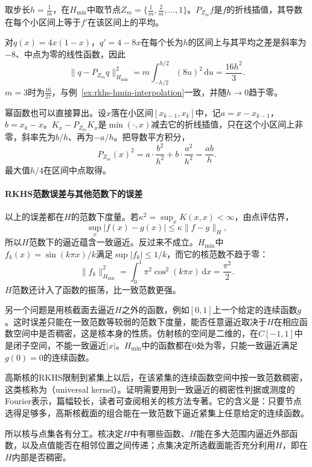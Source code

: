 \begin{example}[最小值核的均匀节点]
\label{ex:rkhs-hmin-grid}
取步长$h=\tfrac1m$，在$H_{\min}$中取节点$Z_m=\{\tfrac1m,\tfrac2m,\ldots,1\}$。$P_{Z_m}f$是$f$的折线插值，其导数在每个小区间上等于$f'$在该区间上的平均。

对$q(x)=4x(1-x)$，$q'=4-8x$在每个长为$h$的区间上与其平均之差是斜率为$-8$、中点为零的线性函数，因此
\[
\lVert q-P_{Z_m}q\rVert_{H_{\min}}^2=m\int_{-h/2}^{h/2}(8u)^2\,\mathrm du=\frac{16h^2}{3}.
\]
$m=3$时为$\tfrac{16}{27}$，与例~\ref{ex:rkhs-hmin-interpolation}一致，并随$h\to0$趋于零。

幂函数也可以直接算出。设$x$落在小区间$[x_{k-1},x_k]$中，记$a=x-x_{k-1}$，$b=x_k-x$。$K_x-P_{Z_m}K_x$是$\min(\cdot,x)$减去它的折线插值，只在这个小区间上非零，斜率先为$b/h$、再为$-a/h$。把导数平方积分，
\[
P_{Z_m}(x)^2=a\cdot\frac{b^2}{h^2}+b\cdot\frac{a^2}{h^2}=\frac{ab}{h}.
\]
最大值$h/4$在区间中点取得。
\end{example}

\paragraph{RKHS范数误差与其他范数下的误差}

以上的误差都在$H$的范数下度量。若$\kappa^2=\sup_xK(x,x)<\infty$，由点评估界，
\[
\sup_x\lvert f(x)-g(x)\rvert\leq\kappa\lVert f-g\rVert_H ,
\]
所以$H$范数下的逼近蕴含一致逼近。反过来不成立。$H_{\min}$中$f_k(x)=\sin(k\pi x)/k$满足$\sup\lvert f_k\rvert\leq1/k$，而它的核范数不趋于零：
\[
\lVert f_k\rVert_{H_{\min}}^2=\int_0^1\pi^2\cos^2(k\pi x)\,\mathrm dx=\frac{\pi^2}2 .
\]
$H$范数还计入了函数的振荡，比一致范数更强。

另一个问题是用核截面去逼近$H$之外的函数，例如$[0,1]$上一个给定的连续函数$g$。这时误差只能在一致范数等较弱的范数下度量，能否任意逼近取决于$H$在相应函数空间中是否稠密，这是核本身的性质。仿射核的空间是二维的，在$C[-1,1]$中是闭子空间，不能一致逼近$\lvert x\rvert$。$H_{\min}$中的函数都在$0$处为零，只能一致逼近满足$g(0)=0$的连续函数。

高斯核的RKHS限制到紧集上以后，在该紧集的连续函数空间中按一致范数稠密，这类核称为（universal kernel）。证明需要用到一致逼近的稠密性判据或测度的Fourier表示，篇幅较长，读者可查阅相关的核方法专著。它的含义是：只要节点选得足够多，高斯核截面的组合能在一致范数下逼近紧集上任意给定的连续函数。

所以核与点集各有分工。核决定$H$中有哪些函数、$H$能在多大范围内逼近外部函数，以及点值能否在相邻位置之间传递；点集决定所选截面能否充分利用$H$，即在$H$内部是否稠密。

